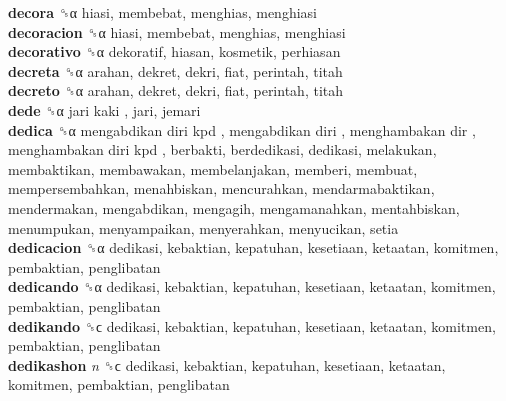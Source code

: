 \textbf{decora} ␝α  hiasi, membebat, menghias, menghiasi  \\
\textbf{decoracion} ␝α  hiasi, membebat, menghias, menghiasi  \\
\textbf{decorativo} ␝α  dekoratif, hiasan, kosmetik, perhiasan  \\
\textbf{decreta} ␝α  arahan, dekret, dekri, fiat, perintah, titah  \\
\textbf{decreto} ␝α  arahan, dekret, dekri, fiat, perintah, titah  \\
\textbf{dede} ␝α   jari kaki , jari, jemari  \\
\textbf{dedica} ␝α   mengabdikan diri kpd ,  mengabdikan diri ,  menghambakan dir ,  menghambakan diri kpd , berbakti, berdedikasi, dedikasi, melakukan, membaktikan, membawakan, membelanjakan, memberi, membuat, mempersembahkan, menahbiskan, mencurahkan, mendarmabaktikan, mendermakan, mengabdikan, mengagih, mengamanahkan, mentahbiskan, menumpukan, menyampaikan, menyerahkan, menyucikan, setia  \\
\textbf{dedicacion} ␝α  dedikasi, kebaktian, kepatuhan, kesetiaan, ketaatan, komitmen, pembaktian, penglibatan  \\
\textbf{dedicando} ␝α  dedikasi, kebaktian, kepatuhan, kesetiaan, ketaatan, komitmen, pembaktian, penglibatan  \\
\textbf{dedikando} ␝ϲ  dedikasi, kebaktian, kepatuhan, kesetiaan, ketaatan, komitmen, pembaktian, penglibatan  \\
\textbf{dedikashon} \emph{n}  ␝ϲ  dedikasi, kebaktian, kepatuhan, kesetiaan, ketaatan, komitmen, pembaktian, penglibatan  \\
